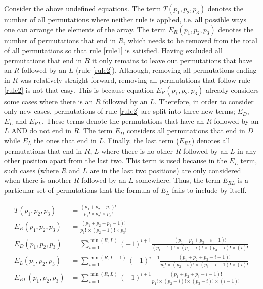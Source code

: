 Consider the above undefined equations. 
The term \(T(p_1,p_2,p_3)\) denotes the number of all permutations where neither 
rule is applied, i.e. all possible ways one can arrange the elements of the array.
The term \(E_R(p_1,p_2,p_3)\) denotes the number of permutations that end in \(R\), 
which needs to be removed from the total of all permutations so that rule \ref{rule1} 
is satisfied.
Having excluded all permutations that end in \(R\) it only remains to leave out 
permutations that have an \(R\) followed by an \(L\) (rule \ref{rule2}).
Although, removing all permutations ending in \(R\) was relatively straight forward,
removing all permutations that follow rule \ref{rule2} is not that easy.
This is because equation \(E_R(p_1,p_2,p_3)\) already considers some cases where 
there is an \(R\) followed by an \(L\).
Therefore, in order to consider only new cases, permutations of rule \ref{rule2} 
are split into three new terms; \(E_D\), \(E_L\) and \(E_{RL}\).
These terms denote the permutations that have an \(R\) followed by an \(L\) AND 
do not end in \(R\).
The term \(E_D\) considers all permutations that end in \(D\) while \(E_L\) the 
ones that end in \(L\).
Finally, the last term (\(E_{RL}\)) denotes all permutations that end in \(R\), 
\(L\) where there is no other \(R\) followed by an \(L\) in any other position apart 
from the last two. 
This term is used because in the \(E_L\) term, such cases (where \(R\) and \(L\) 
are in the last two positions) are only considered when there is another \(R\) followed 
by an \(L\) somewhere.
Thus, the term \(E_{RL}\) is a particular set of permutations that the formula of 
\(E_L\) fails to include by itself.

\begin{align}
    T(p_1, p_2, p_3) &= \frac{(p_1 + p_2 + p_3)!}{p_1! \times p_2! \times p_3!} \\
    E_R(p_1, p_2, p_3) &= \frac{(p_1 + p_2 + p_3 - 1)!}
    {p_1! \times (p_2-1)! \times p_3!} \\
    E_D(p_1, p_2, p_3) &= \sum_{i=1}^{\min(R,L)} (-1)^{i+1} 
    \frac{(p_1 + p_2 + p_3 - i - 1)!}
    {(p_1 - 1)! \times (p_2 - i)! \times (p_3 - i)! \times (i)!} \\
    E_L(p_1, p_2, p_3) &= \sum_{i=1}^{\min(R,L-1)} (-1)^{i+1} 
    \frac{(p_1 + p_2 + p_3 - i - 1)!}
    {p_1! \times (p_2 - i)! \times (p_3 - i - 1)! \times (i)!} \\
    E_{RL}(p_1, p_2, p_3) &= \sum_{i=1}^{\min(R,L)} (-1)^{i+1} 
    \frac{(p_1 + p_2 + p_3 - i - 1)!}
    {p_1! \times (p_2 - i)! \times (p_3 - i)! \times (i - 1)!} 
\end{align}


